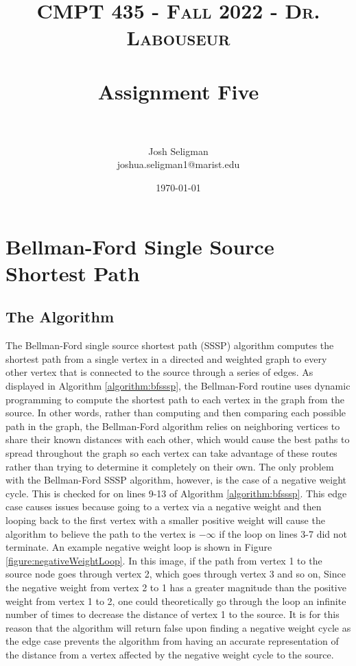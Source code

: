 \documentclass[letterpaper, 10pt,DIV=13]{scrartcl}
\title{	
   \normalfont \normalsize 
   \textsc{CMPT 435 - Fall 2022 - Dr. Labouseur} \\[10pt] %
   \horrule{0.5pt} \\[0.25cm] 	%
   \huge Assignment Five  \\     	    %
   \horrule{0.5pt} \\[0.25cm] 	%
}
\author{Josh Seligman \\ \normalsize joshua.seligman1@marist.edu}
\date{\normalsize\today} 	%
\numberwithin{equation}{section} %
\numberwithin{figure}{section} %
\numberwithin{table}{section} %
\begin{document}
\maketitle %

\section{Bellman-Ford Single Source Shortest Path}
\subsection{The Algorithm}
The Bellman-Ford single source shortest path (SSSP) algorithm computes the shortest path from a single vertex in a directed and weighted graph to every other vertex that is connected to the source through a series of edges. As displayed in Algorithm \ref{algorithm:bfsssp}, the Bellman-Ford routine uses dynamic programming to compute the shortest path to each vertex in the graph from the source. In other words, rather than computing and then comparing each possible path in the graph, the Bellman-Ford algorithm relies on neighboring vertices to share their known distances with each other, which would cause the best paths to spread throughout the graph so each vertex can take advantage of these routes rather than trying to determine it completely on their own. The only problem with the Bellman-Ford SSSP algorithm, however, is the case of a negative weight cycle. This is checked for on lines 9-13 of Algorithm \ref{algorithm:bfsssp}. This edge case causes issues because going to a vertex via a negative weight and then looping back to the first vertex with a smaller positive weight will cause the algorithm to believe the path to the vertex is $-\infty$ if the loop on lines 3-7 did not terminate. An example negative weight loop is shown in Figure \ref{figure:negativeWeightLoop}. In this image, if the path from vertex 1 to the source node goes through vertex 2, which goes through vertex 3 and so on, Since the negative weight from vertex 2 to 1 has a greater magnitude than the positive weight from vertex 1 to 2, one could theoretically go through the loop an infinite number of times to decrease the distance of vertex 1 to the source. It is for this reason that the algorithm will return false upon finding a negative weight cycle as the edge case prevents the algorithm from having an accurate representation of the distance from a vertex affected by the negative weight cycle to the source.
\end{document}
